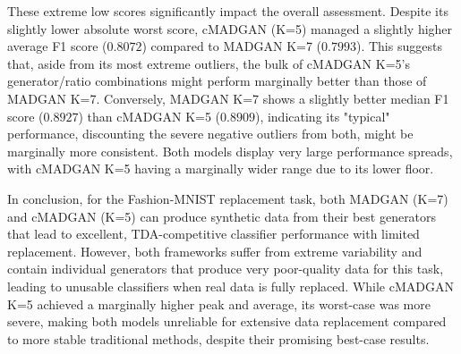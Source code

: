 These extreme low scores significantly impact the overall assessment. Despite its slightly lower absolute worst score, cMADGAN (K=5) managed a slightly higher average F1 score ($0.8072$) compared to MADGAN K=7 ($0.7993$). This suggests that, aside from its most extreme outliers, the bulk of cMADGAN K=5's generator/ratio combinations might perform marginally better than those of MADGAN K=7. Conversely, MADGAN K=7 shows a slightly better median F1 score ($0.8927$) than cMADGAN K=5 ($0.8909$), indicating its "typical" performance, discounting the severe negative outliers from both, might be marginally more consistent. Both models display very large performance spreads, with cMADGAN K=5 having a marginally wider range due to its lower floor.

In conclusion, for the Fashion-MNIST replacement task, both MADGAN (K=7) and cMADGAN (K=5) can produce synthetic data from their best generators that lead to excellent, TDA-competitive classifier performance with limited replacement. However, both frameworks suffer from extreme variability and contain individual generators that produce very poor-quality data for this task, leading to unusable classifiers when real data is fully replaced. While cMADGAN K=5 achieved a marginally higher peak and average, its worst-case was more severe, making both models unreliable for extensive data replacement compared to more stable traditional methods, despite their promising best-case results.



